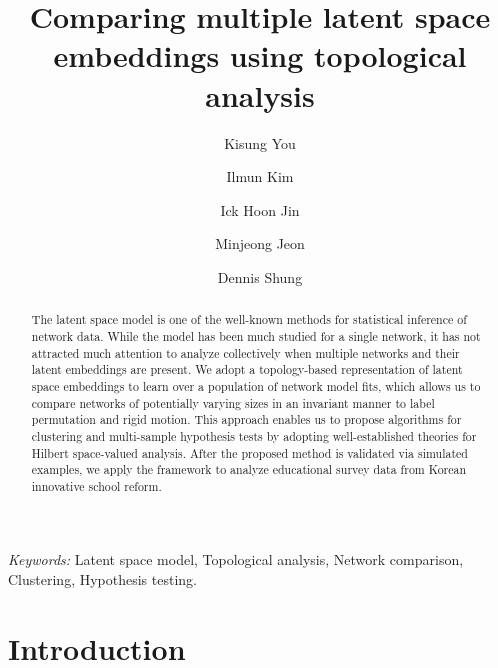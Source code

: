 \documentclass[12pt]{article}
\begin{document}
%

\def\spacingset#1{\renewcommand{\baselinestretch}%
{#1}\small\normalsize} \spacingset{1}



\title{Comparing multiple latent space embeddings using topological analysis}
\author[1]{Kisung You}
\author[2,3]{Ilmun Kim}
\author[2,3]{Ick Hoon Jin}
\author[4]{Minjeong Jeon}
\author[1]{Dennis Shung}
\date{}

\maketitle

\bigskip
\begin{abstract}
The latent space model is one of the well-known methods for statistical inference of network data. While the model has been much studied for a single network, it has not attracted much attention to analyze collectively when multiple networks and their latent embeddings are present. We adopt a topology-based representation of latent space embeddings to learn over a population of network model fits, which allows us to compare networks of potentially varying sizes in an invariant manner to label permutation and rigid motion. This approach enables us to propose algorithms for clustering and multi-sample hypothesis tests by adopting well-established theories for Hilbert space-valued analysis. After the proposed method is validated via simulated examples, we apply the framework to analyze educational survey data from Korean innovative school reform. 
\end{abstract}

\noindent%
{\it Keywords:} Latent space model, Topological analysis, Network comparison, Clustering, Hypothesis testing.
\vfill

\newpage
\spacingset{1.9} %
\section{Introduction}\label{sec:introduction}
\end{document}
